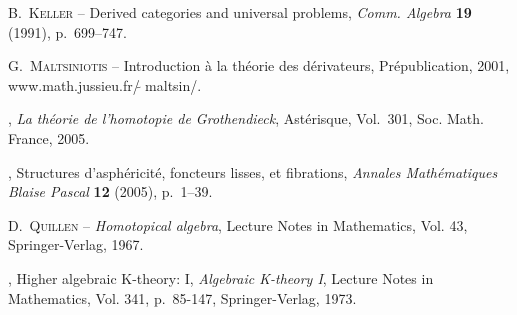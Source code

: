 \documentclass[francais]{smfart}
\theoremstyle{plain}
\theoremstyle{remark}
\theoremstyle{definition}
\numberwithin{equation}{thm}
\begin{document}
\begin{thebibliography}{10}
{\scshape B.~Keller} -- {\og Derived categories and universal problems\fg},
  \emph{Comm. Algebra} \textbf{19} (1991), p.~699--747.

{\scshape G.~Maltsiniotis} -- {\og Introduction à la th\'eorie des
  d\'erivateurs\fg}, Pr\'epublication, 2001, www.math.jussieu.fr/\raise
  -3.3pt\vbox{\hbox{$\widetilde{ \ }\,$}}maltsin/.

\bysame , \emph{La th\'eorie de l'homotopie de {G}rothendieck}, Ast\'erisque,
  Vol.~301, Soc. Math. France, 2005.

\bysame , {\og Structures d'asph\'ericit\'e, foncteurs lisses, et
  fibrations\fg}, \emph{Annales Ma\-th\'e\-ma\-tiques Blaise Pascal}
  \textbf{12} (2005), p.~1--39.

{\scshape D.~Quillen} -- \emph{Homotopical algebra}, Lecture Notes in
  Mathematics, Vol. 43, Springer-Verlag, 1967.

\bysame , {\og Higher algebraic {K}-theory: I\fg}, \emph{Algebraic K-theory I},
  Lecture Notes in Mathematics, Vol. 341, p.~85-147, Springer-Verlag, 1973.

\end{thebibliography}
\end{document}
